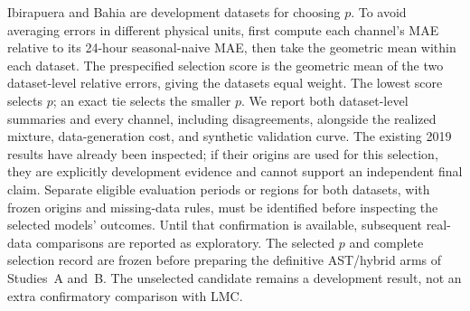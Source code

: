 Ibirapuera and Bahia are development datasets for choosing $p$. To avoid
averaging errors in different physical units, first compute each channel's
MAE relative to its 24-hour seasonal-naive MAE, then take the geometric mean
within each dataset. The prespecified selection score is the geometric mean
of the two dataset-level relative errors, giving the datasets equal weight.
The lowest score selects $p$; an exact tie selects the smaller $p$. We report
both dataset-level summaries and every channel, including disagreements,
alongside the realized mixture, data-generation cost, and synthetic validation
curve. The existing 2019 results have already been inspected; if their origins
are used for this selection, they are explicitly development evidence and
cannot support an independent final claim. Separate eligible evaluation
periods or regions for both datasets, with frozen origins and missing-data
rules, must be identified before inspecting the selected models' outcomes.
Until that confirmation is available, subsequent real-data comparisons are
reported as exploratory. The selected $p$ and complete selection record are
frozen before preparing the definitive AST/hybrid arms of Studies~A and~B.
The unselected candidate remains a development result, not an extra
confirmatory comparison with LMC.


